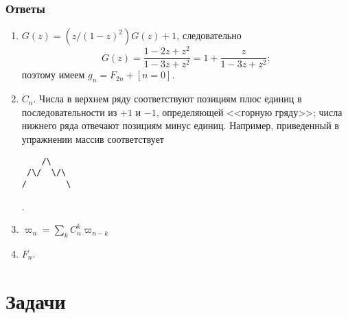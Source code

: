 \documentclass[14pt,openany]{book}
\begin{document}
\section{Ответы}
\begin{enumerate}

\item $G(z)=(z/(1-z)^2)G(z)+1$, следовательно 
$$G(z) = \frac{1-2z+z^2}{1-3z+z^2} = 1 + \frac{z}{1-3z+z^2};$$
поэтому имеем $g_n=F_{2n}+[n=0]$.

\item $C_n$. Числа в верхнем ряду соответствуют позициям плюс единиц в последовательности
из $+1$ и $-1$, определяющей <<горную гряду>>; числа нижнего ряда отвечают позициям
минус единиц. Например, приведенный в упражнении массив соответствует
\begin{verbatim}
    /\     
 /\/  \/\  
/        \ 
\end{verbatim}.

\item $\varpi_n = \sum_k C_n^k\varpi_{n-k}$

\item $F_n$.

\end{enumerate}

\part{Задачи}
\end{document}
